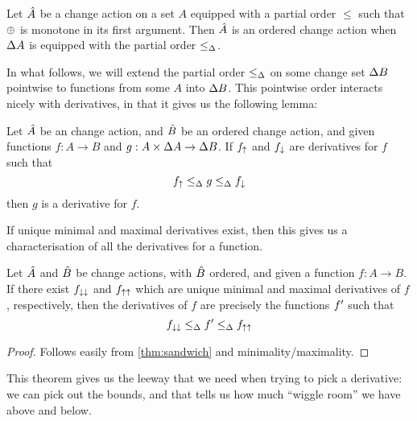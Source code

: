\begin{prop}
  Let $\hat{A}$ be a change action on a set $A$ equipped with a partial order $\leq$ such that
  $\oplus$ is monotone in its first argument. Then $\hat{A}$ is an ordered change action when
  $\Delta A$ is equipped with the partial order $\leq_\Delta$.
\end{prop}

In what follows, we will extend the partial order $\leq_\Delta$ on some change
set $\Delta B$ pointwise to functions from some $A$ into $\Delta B$. This pointwise
order interacts nicely with derivatives, in that it gives us the following lemma:

\begin{thm}
  \label{thm:sandwich}
  Let $\hat{A}$ be an change action, and $\hat{B}$ be an ordered change action, and given functions
  $f: {A} \rightarrow {B}$ and $g: A \times \Delta A \rightarrow
  \Delta B$. If $f_\uparrow$ and $f_\downarrow$ are
  derivatives for $f$ such that
  \begin{displaymath}
    f_\uparrow \leq_\Delta g \leq_\Delta f_\downarrow
  \end{displaymath}
  then $g$ is a derivative for $f$.
\end{thm}

If unique minimal and maximal derivatives exist, then this gives us a 
characterisation of all the derivatives for a function.

\begin{thm}
\label{thm:derivativeCharacterization}
  Let $\hat{A}$ and $\hat{B}$ be change actions, with $\hat{B}$ ordered, and given a function
  $f: {A} \rightarrow {B}$. If there exist $f_{\downarrow\downarrow}$ and
  $f_{\uparrow\uparrow}$ which are unique minimal and maximal derivatives of $f$,
  respectively, then the derivatives of $f$ are precisely
  the functions $f'$ such that
  \begin{displaymath}
    f_{\downarrow\downarrow} \leq_\Delta f' \leq_\Delta f_{\uparrow\uparrow}
  \end{displaymath}
\end{thm}
\ifproofs
\begin{proof}
  Follows easily from \cref{thm:sandwich} and minimality/maximality.
\end{proof}
\fi

This theorem gives us the leeway that we need when trying to pick a derivative: we can pick out the
bounds, and that tells us how much ``wiggle room'' we have above and below.

